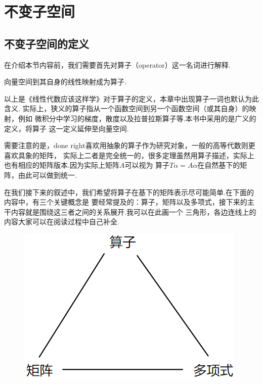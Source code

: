 \chapter{不变子空间}

\section{不变子空间的定义}
在介绍本节内容前，我们需要首先对算子（operator）这一名词进行解释.
\begin{definition}
	向量空间到其自身的线性映射成为算子.
\end{definition}
以上是《线性代数应该这样学》对于算子的定义，本章中出现算子一词也默认为此含义.
实际上，狭义的算子指从一个函数空间到另一个函数空间（或其自身）的映射，例如
微积分中学习的梯度，散度以及拉普拉斯算子等.本书中采用的是广义的定义，将算子
这一定义延伸至向量空间.

需要注意的是，done right喜欢用抽象的算子作为研究对象，一般的高等代数则更喜欢具象的矩阵，
实际上二者是完全统一的，很多定理虽然用算子描述，实际上也有相应的矩阵版本.因为实际上矩阵$A$可以视为
算子$T\alpha=A\alpha$在自然基下的矩阵，由此可以做到统一.

在我们接下来的叙述中，我们希望将算子在基下的矩阵表示尽可能简单.在下面的内容中，有三个关键概念是
要经常提及的：算子，矩阵以及多项式，接下来的主干内容就是围绕这三者之间的关系展开.我可以在此画一个
三角形，各边连线上的内容大家可以在阅读过程中自己补全.
\begin{figure}[h]
	\centering
	\includegraphics[scale=0.4]{./figs/15/15-1.png}
\end{figure}

